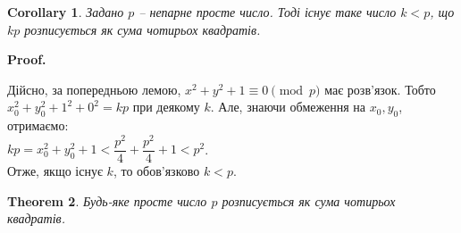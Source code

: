 \documentclass[a4paper, 14pt]{extarticle}
\makeatletter
\theoremstyle{theoremdd}
\newtheorem{theorem}{Theorem}[subsection]
\theoremstyle{theoremdd}
\theoremstyle{theoremdd}
\theoremstyle{theoremdd}
\theoremstyle{theoremdd}
\theoremstyle{theoremdd}
\theoremstyle{theoremdd}
\theoremstyle{theoremdd}
\newtheorem{corollary}[theorem]{Corollary}
\def\qed{$\blacksquare$}
\renewenvironment{proof}[1][Proof.\\]{\par
\pushQED{\hfill \qed}%
\normalfont \topsep6\p@\@plus6\p@\relax
\trivlist
\item\relax
{\bfseries
#1\@addpunct{.}}\hspace\labelsep\ignorespaces
}{%
\popQED\endtrivlist\@endpefalse
}
\makeatother
\begin{document}
\begin{corollary}
Задано $p$ -- непарне просте число. Тоді існує таке число $k < p$, що $kp$ розписується як сума чотирьох квадратів.
\end{corollary}

\begin{proof}
Дійсно, за попередньою лемою, $x^2+y^2+1 \equiv 0 \pmod p$ має розв'язок. Тобто $x_0^2+y_0^2+1^2+0^2 = kp$ при деякому $k$. Але, знаючи обмеження на $x_0,y_0$, отримаємо:\\
$kp = x_0^2+y_0^2+1 < \dfrac{p^2}{4} + \dfrac{p^2}{4} + 1 < p^2$.\\
Отже, якщо існує $k$, то обов'язково $k < p$.
\end{proof}

\begin{theorem}
Будь-яке просте число $p$ розписується як сума чотирьох квадратів.
\end{theorem}
\end{document}
